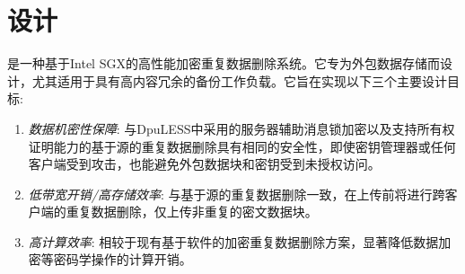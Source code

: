 \section{\sysnameS 设计}
\label{sec:design}


\sysnameS 是一种基于Intel SGX的高性能加密重复数据删除系统。它专为外包数据存储而设计，尤其适用于具有高内容冗余的备份工作负载。它旨在实现以下三个主要设计目标:
\begin{enumerate}
    \item \textit{数据机密性保障}: 与DpuLESS\cite{bellare13b}中采用的服务器辅助消息锁加密以及支持所有权证明\cite{halevi11}能力的基于源的重复数据删除具有相同的安全性，即使密钥管理器或任何客户端受到攻击，\sysnameS 也能避免外包数据块和密钥受到未授权访问。
    \item \textit{低带宽开销/高存储效率}: 与基于源的重复数据删除一致，\sysnameS 在上传前将进行跨客户端的重复数据删除，仅上传非重复的密文数据块。
    \item \textit{高计算效率}: 相较于现有基于软件的加密重复数据删除方案，\sysnameS 显著降低数据加密等密码学操作的计算开销。
\end{enumerate}

